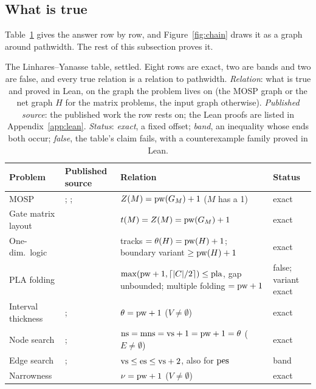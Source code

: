 \subsection{What is true}
\label{sec:true}

Table~\ref{tab:master} gives the answer row by row, and
Figure~\ref{fig:chain} draws it as a graph around pathwidth. The rest of this
subsection proves it.

\begin{table}[tbp]
\centering\small
\caption{The Linhares--Yanasse table, settled. Eight rows are exact, two are
bands and two are false, and every true relation is a relation to pathwidth.
\emph{Relation}: what is true and proved in Lean, on the graph the problem
lives on (the MOSP graph or the net graph $H$ for the matrix problems, the input
graph otherwise). \emph{Published source}: the published work the row rests on; the
Lean proofs are listed in Appendix~\ref{app:lean}. \emph{Status}: \emph{exact}, a fixed
offset; \emph{band}, an inequality whose ends both occur; \emph{false}, the
table's claim fails, with a counterexample family proved in Lean.}
\label{tab:master}
\begin{tabularx}{\linewidth}{@{}>{\raggedright}p{2.7cm}>{\raggedright}p{3.4cm}>{\raggedright\arraybackslash}X l@{}}
\toprule
Problem & Published source & Relation & Status \\
\midrule
MOSP & \citet{Yanasse1997a}; \citet{FellowsLangston1989}; \citet{LY2002} &
  $Z(M)=\mathrm{pw}(G_M)+1$ ($M$ has a 1) & exact \\
Gate matrix layout & \citet{LY2002ref6} & $t(M)=Z(M)=\mathrm{pw}(G_M)+1$ & exact \\
One-dim.\ logic & \citet{LY2002ref7} & tracks $=\theta(H)=\mathrm{pw}(H)+1$; boundary variant $\ge\mathrm{pw}(H)+1$ & exact \\
PLA folding & \citet{LY2002ref6} & $\max(\mathrm{pw}+1,\lceil|C|/2\rceil)\le\mathrm{pla}$, gap unbounded; multiple folding $=\mathrm{pw}+1$ & false; variant exact \\
Interval thickness & \citet{LY2002ref6}; \citet{LY2002ref9} & $\theta=\mathrm{pw}+1$ ($V\ne\emptyset$) & exact \\
Node search & \citet{LY2002ref9,LY2002ref10}; \citet{BienstockSeymour1991} & $\mathrm{ns}=\mathrm{mns}=\mathrm{vs}+1=\mathrm{pw}+1=\theta$ ($E\ne\emptyset$) & exact \\
Edge search & \citet{EllisSudboroughTurner1994}; \citet{LY2002ref10} & $\mathrm{vs}\le\mathrm{es}\le\mathrm{vs}+2$, also for $\mathrm{pes}$ & band \\
Narrowness & \citet{LY2002ref11} & $\nu=\mathrm{pw}+1$ ($V\ne\emptyset$) & exact \\

\end{tabularx}
\end{table}
